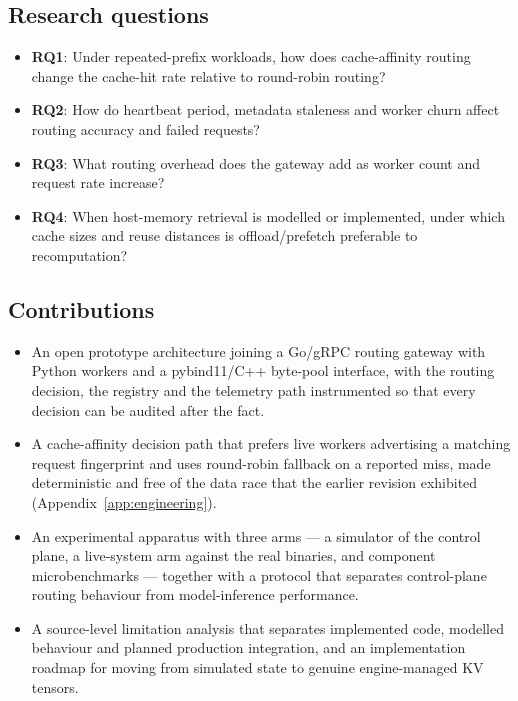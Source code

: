 \documentclass[10pt,twocolumn]{article}
\begin{document}
\subsection{Research questions}

\begin{itemize}
\item \textbf{RQ1}: Under repeated-prefix workloads, how does cache-affinity
routing change the cache-hit rate relative to round-robin routing?
\item \textbf{RQ2}: How do heartbeat period, metadata staleness and worker
churn affect routing accuracy and failed requests?
\item \textbf{RQ3}: What routing overhead does the gateway add as worker count
and request rate increase?
\item \textbf{RQ4}: When host-memory retrieval is modelled or implemented,
under which cache sizes and reuse distances is offload/prefetch preferable to
recomputation?
\end{itemize}

\subsection{Contributions}

\begin{itemize}
\item An open prototype architecture joining a Go/gRPC routing gateway with
Python workers and a pybind11/C++ byte-pool interface, with the routing
decision, the registry and the telemetry path instrumented so that every
decision can be audited after the fact.
\item A cache-affinity decision path that prefers live workers advertising a
matching request fingerprint and uses round-robin fallback on a reported miss,
made deterministic and free of the data race that the earlier revision
exhibited (Appendix~\ref{app:engineering}).
\item An experimental apparatus with three arms --- a simulator of the control
plane, a live-system arm against the real binaries, and component
microbenchmarks --- together with a protocol that separates control-plane
routing behaviour from model-inference performance.
\item A source-level limitation analysis that separates implemented code,
modelled behaviour and planned production integration, and an implementation
roadmap for moving from simulated state to genuine engine-managed KV tensors.
\end{itemize}
\end{document}
